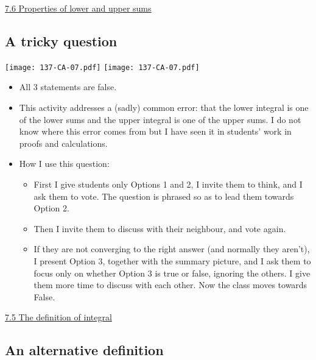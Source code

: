 \documentclass[11pt]{article}
\newcommand{\nl}{\hfill \vspace{-1.1\baselineskip}} %
\newcommand{\vv}{\hspace{8mm} \href{https://www.youtube.com/watch?v=dZ_TWQbksbg&list=PLlwePzQY_wW9vqCkUudCmoOvnNmr9vMuJ&index=5}{7.5 The definition of integral}}
\newcommand{\vvi}{\hspace{8mm} \href{https://www.youtube.com/watch?v=Ev2w9NYqNvc&list=PLlwePzQY_wW9vqCkUudCmoOvnNmr9vMuJ&index=6}{7.6 Properties of lower and upper sums}}
\begin{document}
\begin{videos}
\vvi
\end{videos}

\newpage
\subsection{A tricky question}

\begin{center}
{ \texttt{[image: 137-CA-07.pdf]}} \quad
{ \texttt{[image: 137-CA-07.pdf]}} 
\end{center}

\begin{comments}
\nl
	\begin{itemize}
		\item All 3 statements are false.
		\item This activity addresses a (sadly) common error: that the lower integral is one of the lower sums and the upper integral is one of the upper sums.  I do not know where this error comes from but I have seen it in students' work in proofs and calculations.
		\item How I use this question:	
			\begin{itemize}
				\item  First I give students only Options 1 and 2, I invite them to think, and I ask them to vote.  The question is phrased so as to lead them towards Option 2.
				\item Then I invite them to discuss with their neighbour, and vote again.
				\item If they are not converging to the right answer (and normally they aren't), I present Option 3, together with the summary picture, and I ask them to focus only on whether Option 3 is true or false, ignoring the others.  I give them more time to discuss with each other.  Now the class moves towards False.
			\end{itemize}
		\end{itemize}
\end{comments}

\begin{videos}
\vv
\end{videos}

\newpage
\subsection{An alternative definition}
\end{document}
